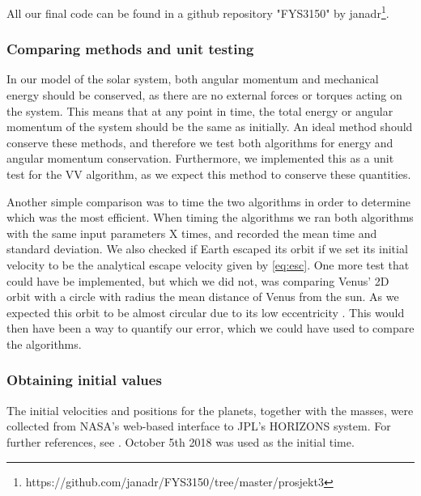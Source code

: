 All our final code can be found in
a github repository "FYS3150" by janadr\footnote{https://github.com/janadr/FYS3150/tree/master/prosjekt3}.
\subsubsection{Comparing methods and unit testing} \label{sec:tests}
In our model of the solar system, both angular momentum and mechanical energy should be conserved, as there
are no external forces or torques acting on the system. This means that at any point in time, the total energy or
angular momentum of the system should be the same as initially. An ideal method should conserve these methods,
and therefore we test both algorithms for energy and angular momentum conservation.
Furthermore, we implemented this as a unit test for the VV algorithm, as we expect this method to conserve these quantities.

Another simple comparison was to time the two algorithms in order to determine which was the most efficient. When timing the algorithms we ran both algorithms with the same input parameters X times, and recorded the mean time and standard deviation.
We also checked if Earth escaped its orbit if we set its initial velocity to be the analytical
escape velocity given by \ref{eq:esc}.
One more test that could have be implemented, but which we did not, was comparing Venus' 2D orbit with a circle
with radius the mean distance of Venus from the sun. As we expected this orbit to be
almost circular due to its low eccentricity \cite{planetaryfactsheet}. This would then have been a way to quantify our error, which we could have used to compare the algorithms.

\subsubsection{Obtaining initial values}
The initial velocities and positions for the planets, together with the masses, were collected from NASA's web-based interface to JPL's HORIZONS system. For further references, see \cite{horizon}. October 5th 2018 was used as the initial time.
